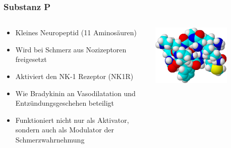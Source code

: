 \documentclass{beamer}
\begin{document}
\begin{frame}
\frametitle{Substanz P}

\begin{columns}[c]
\begin{column}{5cm}
\begin{itemize}
\item
Kleines Neuropeptid (11 Aminosäuren)
\item
Wird bei Schmerz aus Nozizeptoren freigesetzt
\item
Aktiviert den NK-1 Rezeptor (NK1R)
\item
Wie Bradykinin an Vasodilatation und Entzündungsgeschehen beteiligt 
\item 
Funktioniert nicht nur als Aktivator, sondern auch als \textcolor{theme}{Modulator} der Schmerzwahrnehmung
\end{itemize}

\end{column}

\begin{column}{5cm}
\begin{center}
\includegraphics[width=0.7\textwidth]{Substance_P.png}
\end{center}
\end{column}
\end{columns}


\end{frame}


\end{document}
